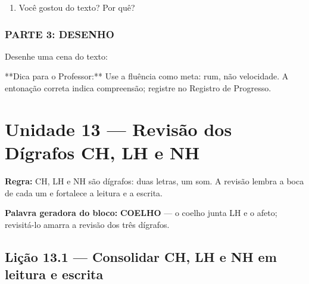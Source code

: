 \begin{exercicio}
\begin{enumerate}
  \item Você gostou do texto? Por quê?
  \begin{center}
  \underline{\hspace{12cm}}
  \end{center}

\end{enumerate}

\subsection*{PARTE 3: DESENHO}

Desenhe uma cena do texto:

\begin{center}
\end{center}

\end{exercicio}

\begin{dica}
**Dica para o Professor:** Use a fluência como meta: rum, não velocidade. A entonação correta indica compreensão; registre no Registro de Progresso.
\end{dica}


\chapter{Unidade 13 --- Revisão dos Dígrafos CH, LH e NH}


\textbf{Regra:} CH, LH e NH são dígrafos: duas letras, um som. A revisão lembra a boca de cada um e fortalece a leitura e a escrita.

\textbf{Palavra geradora do bloco:} \textbf{COELHO} --- o coelho junta LH e o afeto; revisitá-lo amarra a revisão dos três dígrafos.

\section{Lição 13.1 --- Consolidar CH, LH e NH em leitura e escrita}

